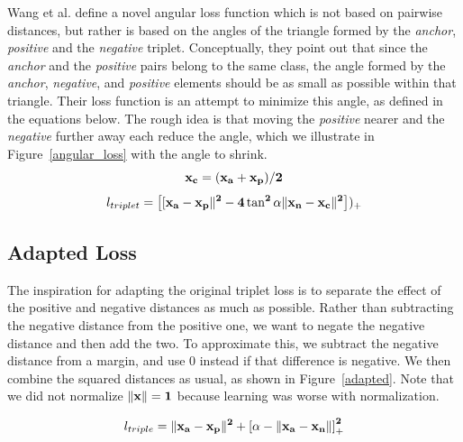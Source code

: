 Wang et al. \cite{DBLP:journals/corr/abs-1708-01682} define a novel
angular loss function which is not based on pairwise distances, but
rather is based on the angles of the triangle formed by the
\textit{anchor}, \textit{positive} and the \textit{negative} triplet.
Conceptually, they point out that since the \textit{anchor} and the
\textit{positive} pairs belong to the same class, the angle formed by
the \textit{anchor}, \textit{negative}, and \textit{positive} elements
should be as small as possible within that triangle.  Their loss
function is an attempt to minimize this angle, as defined in the
equations below.  The rough idea is that moving the \textit{positive} nearer
and the \textit{negative} further away each reduce the angle, which we
illustrate in Figure~\ref{angular_loss} with the angle to shrink.
\begin{equation}
\bf{x_{c}} = (\bf{x_{a}} + \bf{x_{p}}) / 2
\end{equation}
\begin{equation}
l_{triplet} = \left[[\bf{x_{a}} - \bf{x_{p}}\|^2 - 4 \tan^2 \alpha \|\bf{x_{n}} - \bf{x_{c}}\|^2 \right])_{+}
\end{equation}

\subsection{Adapted Loss}

The inspiration for adapting the original triplet loss is to separate the effect of the positive
and negative distances as much as possible.  Rather than subtracting
the negative distance from the positive one, we want to negate the
negative distance and then add the two.  To approximate this, we
subtract the negative distance from a margin, and use 0 instead if
that difference is negative.  We then combine the squared distances as
usual, as shown in Figure~\ref{adapted}.  Note that we did not normalize $\|\bf{x} \| = 1$ because learning was worse with normalization.

\begin{equation}
  l_{triple} =  \|\bf{x_a} - \bf{x_p}\|^2 + \left[ \alpha - \|\bf{x_a} -\bf{x_n}\| \right]_+^2
\label{adapted}
\end{equation}


